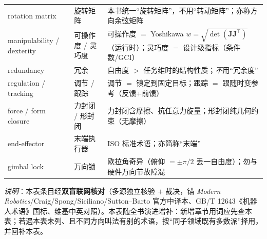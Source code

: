 \begin{center}
\begin{longtable}{p{} p{} p{}}
rotation matrix & 旋转矩阵 & 本书统一“旋转矩阵”，不用“转动矩阵”；亦称方向余弦矩阵 \\
manipulability / dexterity & 可操作度 / 灵巧度 & 可操作度 $=$ Yoshikawa $w=\sqrt{\det(\mathbf{J}\mathbf{J}^\top)}$（运行时）；灵巧度 $=$ 设计级指标（条件数/GCI）\\
redundancy & 冗余 & 自由度 $>$ 任务维时的结构性质；\emph{不}用“冗余度” \\
regulation / tracking & 调节 / 跟踪 & 调节 $=$ 镇定到固定目标；跟踪 $=$ 跟随时变参考（反馈+前馈）\\
force / form closure & 力封闭 / 形封闭 & 力封闭含摩擦、抗任意力旋量；形封闭纯几何约束（无摩擦）\\
end-effector & 末端执行器 & ISO 标准术语；亦简称“末端” \\
gimbal lock & 万向锁 & 欧拉角奇异（俯仰 $=\pm\pi/2$ 丢一自由度）；勿与硬件万向节故障混 \\
\end{longtable}
\end{center}

\begin{center}\small
\emph{说明}：本表条目经\textbf{双盲联网核对}（多源独立核验 $+$ 裁决，锚 \emph{Modern Robotics}/Craig/Spong/Siciliano/Sutton--Barto 官方中译本、GB/T 12643《机器人术语》国标、维基中英对照）。本表随全书演进增补：新增章节用词应先查本表；若遇本表未列、且不同方向叫法有别的术语，按“同子领域既有多数派”择用，并回补本表。
\end{center}
